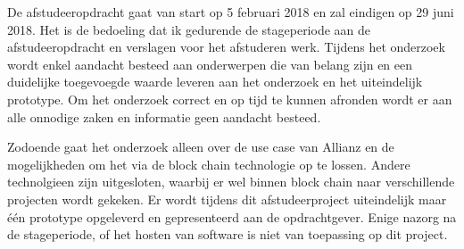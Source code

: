 De afstudeeropdracht gaat van start op 5 februari 2018 en zal eindigen op 29 juni 2018. Het is de bedoeling dat ik gedurende de stageperiode aan de afstudeeropdracht en verslagen voor het afstuderen werk. Tijdens het onderzoek wordt enkel aandacht besteed aan onderwerpen die van belang zijn en een duidelijke toegevoegde waarde leveren aan het onderzoek en het uiteindelijk prototype. Om het onderzoek correct en op tijd te kunnen afronden wordt er aan alle onnodige zaken en informatie geen aandacht besteed.

Zodoende gaat het onderzoek alleen over de use case van Allianz en de mogelijkheden om het via de block chain technologie op te lossen. Andere technolgieen zijn uitgesloten, waarbij er wel binnen block chain naar verschillende projecten wordt gekeken. Er wordt tijdens dit afstudeerproject uiteindelijk maar één prototype opgeleverd en gepresenteerd aan de opdrachtgever. Enige nazorg na de stageperiode, of het hosten van software is niet van toepassing op dit project.